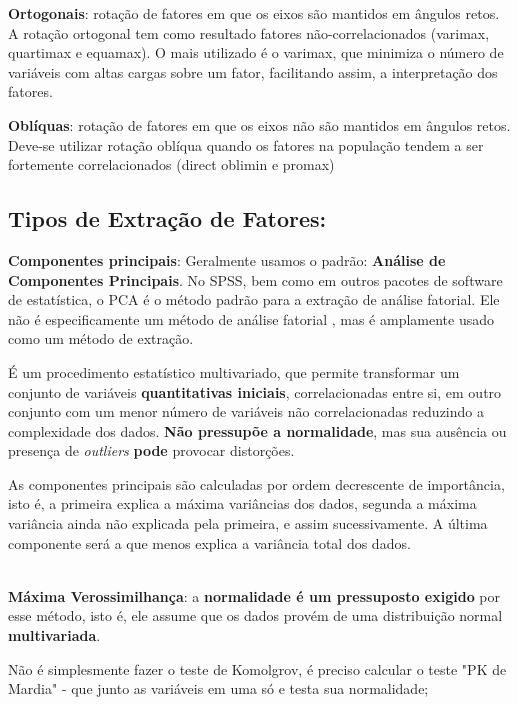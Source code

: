             \textbf{Ortogonais}: rotação de fatores em que os eixos são mantidos em ângulos retos. A rotação ortogonal tem como resultado fatores não-correlacionados (varimax, quartimax e equamax). O mais utilizado é o varimax, que minimiza o número de variáveis com altas cargas sobre um fator, facilitando assim, a interpretação dos fatores.
                
            \textbf{Oblíquas}: rotação de fatores em que os eixos não são mantidos em ângulos retos. Deve-se utilizar rotação oblíqua quando os fatores na população tendem a ser fortemente correlacionados (direct oblimin e promax)
                
    \subsection{Tipos de Extração de Fatores:}
        
        \textbf{Componentes principais}: Geralmente usamos o padrão: \textbf{Análise de Componentes Principais}. No SPSS, bem como em outros pacotes de software de estatística, o PCA é o método padrão para a extração de análise fatorial. Ele não é especificamente um método de análise fatorial , mas é amplamente usado como um método de extração.
            
        É um procedimento estatístico multivariado, que permite transformar um conjunto de variáveis \textbf{quantitativas iniciais}, correlacionadas entre si, em outro conjunto com um menor número de variáveis não correlacionadas reduzindo a complexidade dos dados. \textbf{Não pressupõe a normalidade}, mas sua ausência ou presença de \textit{outliers} \textbf{pode} provocar distorções.
            
        As componentes principais são calculadas por ordem decrescente de importância, isto é, a primeira explica a máxima variâncias dos dados, segunda a máxima variância ainda não explicada pela primeira, e assim sucessivamente. A última componente será a que menos explica a variância total dos dados.
            
        \\
            
        \textbf{Máxima Verossimilhança}: a \textbf{normalidade é um pressuposto exigido} por esse método, isto é, ele assume que os dados provém de uma distribuição normal \textbf{multivariada}.
            
        Não é simplesmente fazer o teste de Komolgrov, é preciso calcular o teste "PK de Mardia" - que junto as variáveis em uma só e testa sua normalidade;
            
